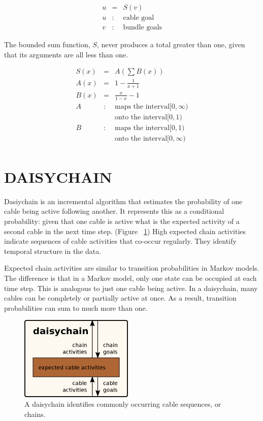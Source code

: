 \documentclass[oneside,twocolumn]{article}
\begin{document}
\begin{eqnarray*}
u &=& S(v)\\ 
u &:& \mbox{cable goal}\\
v &:& \mbox{bundle goals}
\end{eqnarray*}

The bounded sum function, $S$, never produces a total greater than one, given that its arguments are all less than one.

\begin{eqnarray*}
S(x) & = & A \left (\sum B(x) \right ) \\
A(x) & = & 1 - \frac{1}{x + 1} \\ 
B(x) & = & \frac{x}{1 - x} - 1 \\
A&:& \mbox{maps the interval} [0, \infty)\\
&& \mbox{onto the interval} [0, 1) \\
B&:& \mbox{maps the interval} [0, 1)\\
&& \mbox{onto the interval} [0,\infty ) \\
\end{eqnarray*}


\section*{\color{copper} DAISYCHAIN}

Dasiychain is an incremental algorithm that estimates the probability of one cable being active following another. It represents this as a conditional probability: given that one cable is active what is the expected activity of a second cable in the next time step. (Figure ~\ref{daisychain}) High expected chain activities indicate sequences of cable activities that co-occur regularly. They identify temporal structure in the data. 

Expected chain activities are similar to transition probabilities in Markov models. The difference is that in a Markov model, only one state can be occupied at each time step. This is analogous to just one cable being active. In a daisychain, many cables can be completely or partially active at once. As a result, transition probabilities can sum to much more than one. 

\begin{figure}[ht]
\centering
\includegraphics[height=4.0cm]{figs/daisychain.png}
\caption{A daisychain identifies commonly occurring cable sequences, or chains.}
\label{daisychain}
\end{figure}
\end{document}
